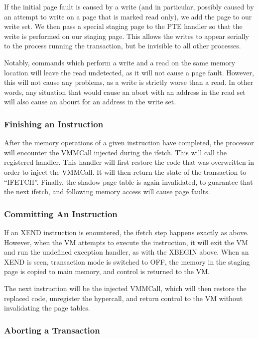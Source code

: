 \documentclass{acm_proc_article-sp}
\begin{document}
If the initial page fault is caused by a write (and in particular, possibly 
caused by an attempt to write on a page that is marked read only), we 
add the page to our write set. We then pass a special staging page to the PTE
handler so that the write is performed on our staging page. This allows the 
writes to appear serially to the process running the transaction, but be
invisible to all other processes.

Notably, commands which perform a write and a read on the same memory location
will leave the read undetected, as it will not cause a page fault. However,
this will not cause any problems, as a write is strictly worse than a read. In
other words, any situation that would cause an abort with an address in the 
read set will also cause an abourt for an address in the write set.

\subsubsection{Finishing an Instruction}

After the memory operations of a given instruction have completed, the 
processor will encounter the VMMCall injected during the ifetch. This will
call the registered handler. This handler will first restore the code that
was overwritten in order to inject the VMMCall. It will then return the state
of the transaction to ``IFETCH''. Finally, the shadow page table is again 
invalidated, to guarantee that the next ifetch, and following memory access 
will cause page faults.  

\subsubsection{Committing An Instruction}

If an XEND instruction is enountered, the ifetch step happens exactly as above.
However, when the VM attempts to execute the instruction, it will exit the VM
and run the undefined exception handler, as with the XBEGIN above. When an XEND
is seen, transaction mode is switched to OFF, the memory in the staging page is
copied to main memory, and control is returned to the VM.

The next instruction will be the injected VMMCall, which will then restore the
replaced code, unregister the hypercall, and return control to the VM without
invalidating the page tables.

\subsubsection{Aborting a Transaction}
\end{document}
